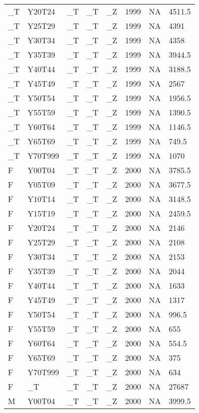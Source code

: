 \begin{longtable}[t]{llllllll}
\_T & Y20T24 & \_T & \_T & \_Z & 1999 & NA & 4511.5\\
\_T & Y25T29 & \_T & \_T & \_Z & 1999 & NA & 4391\\
\_T & Y30T34 & \_T & \_T & \_Z & 1999 & NA & 4358\\
\addlinespace
\_T & Y35T39 & \_T & \_T & \_Z & 1999 & NA & 3944.5\\
\_T & Y40T44 & \_T & \_T & \_Z & 1999 & NA & 3188.5\\
\_T & Y45T49 & \_T & \_T & \_Z & 1999 & NA & 2567\\
\_T & Y50T54 & \_T & \_T & \_Z & 1999 & NA & 1956.5\\
\_T & Y55T59 & \_T & \_T & \_Z & 1999 & NA & 1390.5\\
\addlinespace
\_T & Y60T64 & \_T & \_T & \_Z & 1999 & NA & 1146.5\\
\_T & Y65T69 & \_T & \_T & \_Z & 1999 & NA & 749.5\\
\_T & Y70T999 & \_T & \_T & \_Z & 1999 & NA & 1070\\
F & Y00T04 & \_T & \_T & \_Z & 2000 & NA & 3785.5\\
F & Y05T09 & \_T & \_T & \_Z & 2000 & NA & 3677.5\\
\addlinespace
F & Y10T14 & \_T & \_T & \_Z & 2000 & NA & 3148.5\\
F & Y15T19 & \_T & \_T & \_Z & 2000 & NA & 2459.5\\
F & Y20T24 & \_T & \_T & \_Z & 2000 & NA & 2146\\
F & Y25T29 & \_T & \_T & \_Z & 2000 & NA & 2108\\
F & Y30T34 & \_T & \_T & \_Z & 2000 & NA & 2153\\
\addlinespace
F & Y35T39 & \_T & \_T & \_Z & 2000 & NA & 2044\\
F & Y40T44 & \_T & \_T & \_Z & 2000 & NA & 1633\\
F & Y45T49 & \_T & \_T & \_Z & 2000 & NA & 1317\\
F & Y50T54 & \_T & \_T & \_Z & 2000 & NA & 996.5\\
F & Y55T59 & \_T & \_T & \_Z & 2000 & NA & 655\\
\addlinespace
F & Y60T64 & \_T & \_T & \_Z & 2000 & NA & 554.5\\
F & Y65T69 & \_T & \_T & \_Z & 2000 & NA & 375\\
F & Y70T999 & \_T & \_T & \_Z & 2000 & NA & 634\\
F & \_T & \_T & \_T & \_Z & 2000 & NA & 27687\\
M & Y00T04 & \_T & \_T & \_Z & 2000 & NA & 3999.5\\

\end{longtable}
